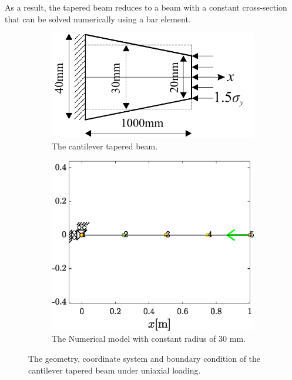 \documentclass{article}
\begin{document}
As a result, the tapered beam reduces to a beam with a constant cross-section that can be solved numerically using a bar element.

\begin{figure}[H]
    \centering
        \begin{subfigure}{0.49\textwidth}
            \includegraphics[width=1\linewidth]{figures/beam.pdf} 
            \caption{The cantilever tapered beam.}
            \label{fig:beam}
        \end{subfigure}
        \begin{subfigure}{0.49\textwidth}
            \includegraphics[width=1\linewidth]{figures/beam_fem.eps} 
            \caption{The Numerical model with constant radius of 30 mm.}
            \label{fig:beam_fem}
        \end{subfigure}
    \caption{The geometry, coordinate system  and boundary condition of the cantilever tapered beam under uniaxial loading.}
    \label{fig:beam_problem}
\end{figure}
\end{document}
